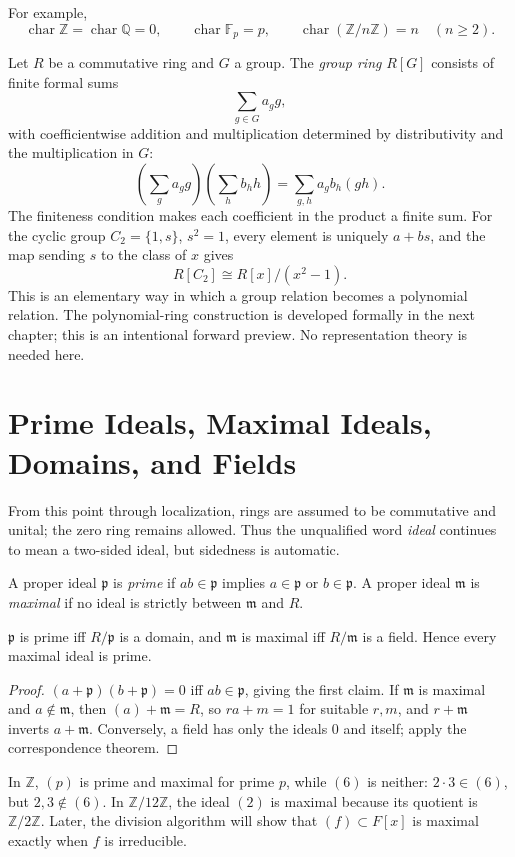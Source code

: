 For example,
\[
\operatorname{char}\mathbb Z=\operatorname{char}\mathbb Q=0,\qquad
\operatorname{char}\mathbb F_p=p,\qquad
\operatorname{char}(\mathbb Z/n\mathbb Z)=n\quad(n\geq2).
\]

\begin{example}
Let \(R\) be a commutative ring and \(G\) a group.  The \emph{group ring}
\(R[G]\) consists of finite formal sums
\[
\sum_{g\in G}a_g g,
\]
with coefficientwise addition and multiplication determined by distributivity
and the multiplication in \(G\):
\[
\left(\sum_g a_g g\right)\left(\sum_h b_h h\right)
=\sum_{g,h}a_gb_h(gh).
\]
The finiteness condition makes each coefficient in the product a finite sum.
For the cyclic group \(C_2=\{1,s\}\), \(s^2=1\), every element is uniquely
\(a+bs\), and the map sending \(s\) to the class of \(x\) gives
\[
R[C_2]\cong R[x]/(x^2-1).
\]
This is an elementary way in which a group relation becomes a polynomial
relation.  The polynomial-ring construction is developed formally in the next
chapter; this is an intentional forward preview.  No representation theory is
needed here.
\end{example}

\section{Prime Ideals, Maximal Ideals, Domains, and Fields}
From this point through localization, rings are assumed to be commutative
and unital; the zero ring remains allowed.  Thus the unqualified word
\emph{ideal} continues to mean a two-sided ideal, but sidedness is automatic.
\begin{definition}
A proper ideal \(\mathfrak p\) is \emph{prime} if
\(ab\in\mathfrak p\) implies \(a\in\mathfrak p\) or \(b\in\mathfrak p\).
A proper ideal \(\mathfrak m\) is \emph{maximal} if no ideal is strictly
between \(\mathfrak m\) and \(R\).
\end{definition}
\begin{theorem}\label{thm:prime-maximal-quotient}
\(\mathfrak p\) is prime iff \(R/\mathfrak p\) is a domain, and
\(\mathfrak m\) is maximal iff \(R/\mathfrak m\) is a field. Hence every
maximal ideal is prime.
\end{theorem}
\begin{proof}
\((a+\mathfrak p)(b+\mathfrak p)=0\) iff \(ab\in\mathfrak p\), giving the
first claim. If \(\mathfrak m\) is maximal and \(a\notin\mathfrak m\), then
\((a)+\mathfrak m=R\), so \(ra+m=1\) for suitable \(r,m\), and
\(r+\mathfrak m\) inverts \(a+\mathfrak m\). Conversely, a field has only
the ideals \(0\) and itself; apply the correspondence theorem.
\end{proof}
In \(\mathbb Z\), \((p)\) is prime and maximal for prime \(p\), while
\((6)\) is neither: \(2\cdot3\in(6)\), but \(2,3\notin(6)\). In
\(\mathbb Z/12\mathbb Z\), the ideal \((2)\) is
maximal because its quotient is \(\mathbb Z/2\mathbb Z\). Later, the
division algorithm will show that \((f)\subset F[x]\) is maximal exactly
when \(f\) is irreducible.

